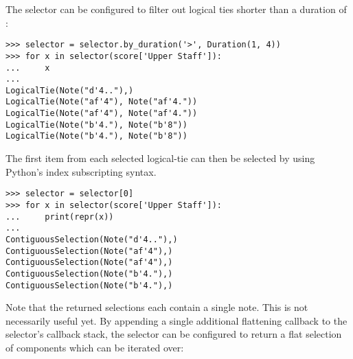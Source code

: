 \noindent The selector can be configured to filter out logical ties shorter
than a duration of :

\begin{comment}
<abjad>
selector = selector.by_duration('>', Duration(1, 4))
for x in selector(score['Upper Staff']):
    x

</abjad>
\end{comment}

\begin{abjadbookoutput}
\begin{singlespacing}
\vspace{-0.5\baselineskip}
\begin{lstlisting}
>>> selector = selector.by_duration('>', Duration(1, 4))
>>> for x in selector(score['Upper Staff']):
...     x
...
LogicalTie(Note("d'4.."),)
LogicalTie(Note("af'4"), Note("af'4."))
LogicalTie(Note("af'4"), Note("af'4."))
LogicalTie(Note("b'4."), Note("b'8"))
LogicalTie(Note("b'4."), Note("b'8"))
\end{lstlisting}
\end{singlespacing}
\end{abjadbookoutput}

\noindent The first item from each selected logical-tie can then be selected by
using Python's index subscripting syntax.

\begin{comment}
<abjad>
selector = selector[0]
for x in selector(score['Upper Staff']):
    print(repr(x))

</abjad>
\end{comment}

\begin{abjadbookoutput}
\begin{singlespacing}
\vspace{-0.5\baselineskip}
\begin{lstlisting}
>>> selector = selector[0]
>>> for x in selector(score['Upper Staff']):
...     print(repr(x))
...
ContiguousSelection(Note("d'4.."),)
ContiguousSelection(Note("af'4"),)
ContiguousSelection(Note("af'4"),)
ContiguousSelection(Note("b'4."),)
ContiguousSelection(Note("b'4."),)
\end{lstlisting}
\end{singlespacing}
\end{abjadbookoutput}

\noindent Note that the returned selections each contain a single note. This is
not necessarily useful yet. By appending a single additional flattening
callback to the selector's callback stack, the selector can be configured to
return a flat selection of components which can be iterated over:

